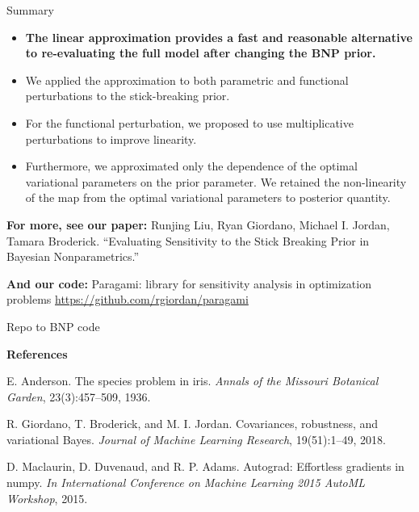 \documentclass[10pt]{beamer}\usepackage[]{graphicx}\usepackage[]{color}
\begin{document}
\begin{frame}{Summary}

\begin{itemize}

\item {\bf The linear approximation provides a fast and reasonable alternative to re-evaluating the full model after changing the BNP prior. }

\pause 

\item We applied the approximation to both parametric and functional perturbations to the stick-breaking prior.

\pause 

\item For the functional perturbation, we proposed to use multiplicative perturbations to improve linearity. 

\pause 

\item Furthermore, we approximated only the dependence of the optimal variational parameters on the prior parameter. We retained the non-linearity of the map from the optimal variational parameters to posterior quantity.

\end{itemize}


\end{frame}

\begin{frame}

{\bf For more, see our paper: }\newline
Runjing Liu, Ryan Giordano, Michael I. Jordan, Tamara Broderick. \newline
“Evaluating Sensitivity to the Stick Breaking Prior in Bayesian Nonparametrics.” 

{\bf And our code: }\newline
Paragami: library for sensitivity analysis in optimization problems \newline
{\color{blue}\url{https://github.com/rgiordan/paragami}}

Repo to BNP code

\vspace{0.2in}

\begin{scriptsize}

{\bf References}

E. Anderson. The species problem in iris. {\itshape Annals of the Missouri Botanical Garden}, 23(3):457–509, 1936.

R. Giordano, T. Broderick, and M. I. Jordan. Covariances, robustness, and variational Bayes. {\itshape Journal of Machine Learning Research}, 19(51):1–49, 2018.

D. Maclaurin, D. Duvenaud, and R. P. Adams. Autograd: Effortless gradients in numpy. {\itshape In International Conference on Machine Learning 2015 AutoML Workshop}, 2015.

\end{scriptsize}

\end{frame}
\end{document}
